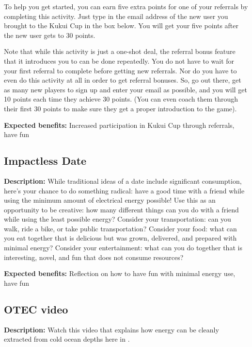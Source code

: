 To help you get started, you can earn five extra points for one of your referrals by completing this activity. Just type in the email address of the new user you brought to the Kukui Cup in the box below. You will get your five points after the new user gets to 30 points.

Note that while this activity is just a one-shot deal, the referral bonus feature that it introduces you to can be done repeatedly.  You do not have to wait for your first referral to complete before getting new referrals.   Nor do you have to even do this activity at all in order to get referral bonuses.  So, go out there, get as many new players to sign up and enter your email as possible, and you will get 10 points each time they achieve 30 points.  (You can even coach them through their first 30 points to make sure they get a proper introduction to the game).

\vspace{2ex}
\textbf{Expected benefits:} Increased participation in Kukui Cup through referrals, have fun


\subsection{Impactless Date}

\textbf{Description:} While traditional ideas of a date include significant consumption, here's your chance to do something radical: have a good time with a friend while using the minimum amount of electrical energy possible! Use this as an opportunity to be creative: how many different things can you do with a friend while using the least possible energy? Consider your transportation: can you walk, ride a bike, or take public transportation? Consider your food: what can you eat together that is delicious but was grown, delivered, and prepared with minimal energy? Consider your entertainment: what can you do together that is interesting, novel, and fun that does not consume resources?

\vspace{2ex}
\textbf{Expected benefits:} Reflection on how to have fun with minimal energy use, have fun


\subsection{OTEC video}

\textbf{Description:} Watch this video that explains how energy can be cleanly extracted from cold ocean depths here in \Hawaii.

